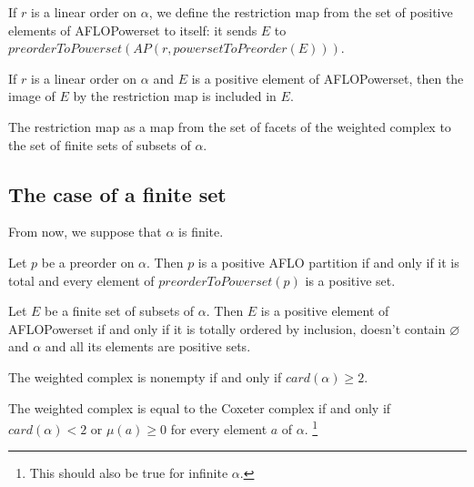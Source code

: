 \begin{subdefi}
If $r$ is a linear order on $\alpha$, we define the restriction map from the set of positive elements of AFLOPowerset to itself: it sends
$E$ to $preorderToPowerset(AP(r,powersetToPreorder(E)))$.
    
\end{subdefi}

\begin{sublemma}
If $r$ is a linear order on $\alpha$ and $E$ is a positive element of AFLOPowerset, then the image of $E$ by the restriction map is included
in $E$.

\end{sublemma}

\begin{subdefi}[R\_weighted]
The restriction map as a map from the set of facets of the weighted complex to the set of finite sets of subsets of $\alpha$.

\end{subdefi}

\subsection{The case of a finite set}

From now, we suppose that $\alpha$ is finite.

\begin{sublemma}
Let $p$ be a preorder on $\alpha$. Then $p$ is a positive AFLO partition if and only if it is total and every element of $preorderToPowerset(p)$ is
a positive set.

\end{sublemma}

\begin{sublemma}
Let $E$ be a finite set of subsets of $\alpha$. Then $E$ is a positive element of AFLOPowerset if and only if it is totally ordered by inclusion,
doesn't contain $\varnothing$ and $\alpha$ and all its elements are positive sets.

\end{sublemma}

\begin{sublemma}
The weighted complex is nonempty if and only if $card(\alpha)\geq 2$.

\end{sublemma}

\begin{sublemma}
The weighted complex is equal to the Coxeter complex if and only if $card(\alpha)<2$ or $\mu(a)\geq 0$ for every element $a$ of $\alpha$.
\footnote{This should also be true for infinite $\alpha$.}

\end{sublemma}


